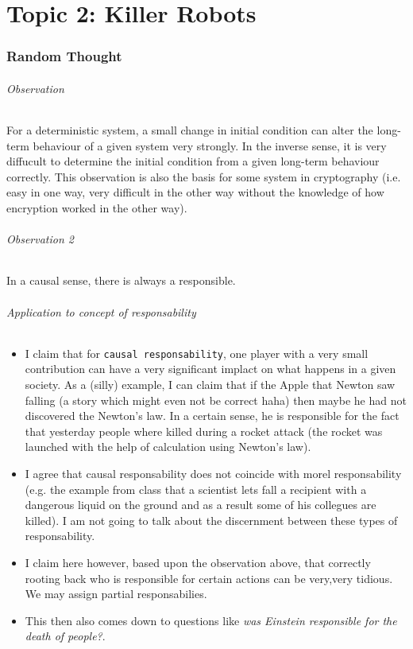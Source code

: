 \documentclass[../main/main.tex]{subfiles}
\begin{document}
\newpage
\part{Topic 2: Killer Robots}
\newpage
\section{Random Thought}
\paragraph{Observation}
For a deterministic system, a small change in initial condition can alter the long-term behaviour of a given system very strongly. In the inverse sense, it is very diffucult to determine the initial condition from a given long-term behaviour correctly. This observation is also the basis for some system in cryptography (i.e. easy in one way, very difficult in the other way without the knowledge of how encryption worked in the other way).

\paragraph{Observation 2}
In a causal sense, there is always a responsible. 

\paragraph{Application to concept of responsability}
\begin{itemize}
\item I claim that for \texttt{causal responsability}, one player with a very small contribution can have a very significant implact on what happens in a given society. As a (silly) example, I can claim that if the Apple that Newton saw falling (a story which might even not be correct haha) then maybe he had not discovered the Newton's law. In a certain sense, he is responsible for the fact that yesterday people where killed during a rocket attack (the rocket was launched with the help of calculation using Newton's law).

\item I agree that causal responsability does not coincide with morel responsability (e.g. the example from class that a scientist lets fall a recipient with a dangerous liquid on the ground and as a result some of his collegues are killed). I am not going to talk about the discernment between these types of responsability.

\item I claim here however, based upon the observation above, that correctly rooting back who is responsible for certain actions can be very,very tidious. We may assign partial responsabilies.

\item This then also comes down to questions like \textit{was Einstein responsible for the death of people?}.
\end{itemize}
\end{document}
